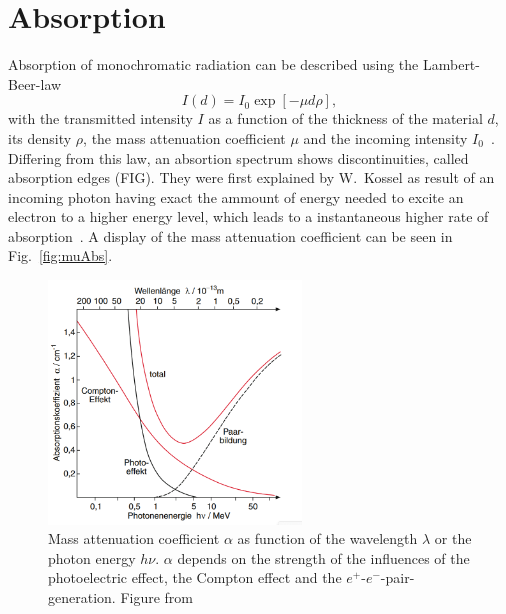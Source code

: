  
\section{Absorption}\label{sec:Q3}
Absorption of monochromatic radiation can be described using the Lambert-Beer-law
\begin{equation}
    I(d) = I_0 \exp[-\mu d\rho],
\end{equation}
with the transmitted intensity $I$ as a function of the thickness of the material $d$, its density $\rho$, the mass attenuation coefficient $\mu$ and the incoming intensity $I_0$~\cite{Bohm.2021}. Differing from this law, an absortion spectrum shows discontinuities, called absorption edges (FIG). They were first explained by W.~Kossel as result of an incoming photon having exact the ammount of energy needed to excite an electron to a higher energy level, which leads to a instantaneous higher rate of absorption~\cite{Kossel.1920}. A display of the mass attenuation coefficient can be seen in Fig.~\ref{fig:muAbs}.

\begin{figure}[ht]
    \centering
    \includegraphics[width = 0.6\textwidth]{Bilder/Grundlagen/MuAbs.png}
    \caption{Mass attenuation coefficient $\alpha$ as function of the wavelength $\lambda$ or the photon energy $h\nu$. $\alpha$ depends on the strength of the influences of the photoelectric effect, the Compton effect and the $e^+$-$e^-$-pair-generation. Figure from \cite{Demtroeder.2016}}
    \label{fig:ConcReflTrans}
\end{figure}